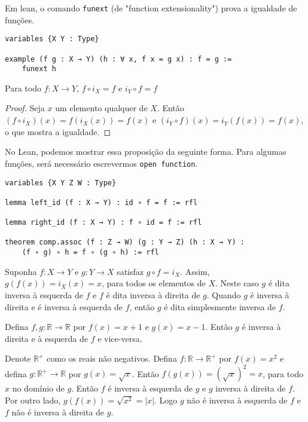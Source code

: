 Em lean, o comando \lstinline{funext} (de "function extensionality") prova a
igualdade de funções.

\begin{lstlisting}
variables {X Y : Type}

example (f g : X → Y) (h : ∀ x, f x = g x) : f = g :=
    funext h
\end{lstlisting}

\begin{theorem}
    \label{prop1}
    Para todo $f: X \to Y$, $f \circ i_X = f$ e $i_Y \circ f = f$
\end{theorem}
\begin{proof}
    Seja $x$ um elemento qualquer de $X$. Então $(f \circ i_X)(x) = f(i_X(x))
     = f(x)$ e $(i_Y \circ f)(x) = i_Y(f(x)) = f(x)$, o que mostra a
     igualdade.
\end{proof}

No Lean, podemos mostrar essa proposição da seguinte forma. Para algumas
funções, será necessário escrevermos \lstinline{open function}.

\begin{lstlisting}
variables {X Y Z W : Type}

lemma left_id (f : X → Y) : id ∘ f = f := rfl

lemma right_id (f : X → Y) : f ∘ id = f := rfl

theorem comp.assoc (f : Z → W) (g : Y → Z) (h : X → Y) :
    (f ∘ g) ∘ h = f ∘ (g ∘ h) := rfl

\end{lstlisting}

\begin{definition}
    \label{def4}
    Suponha $f:X \to Y$ e $g : Y \to X$ satisfaz $g \circ f = i_X$. Assim,
    $g(f(x)) = i_X(x) = x$, para todos os elementos de $X$. Neste caso $g$ é
    dita inversa à esquerda de $f$ e $f$ é dita inversa à direita de $g$.
    Quando $g$ é inversa à direita e é inversa à esquerda de $f$, então $g$ é
    dita simplesmente inversa de $f$.
\end{definition}

\begin{example}
    \label{ex1}
    Defina $f,g : \mathbb{R} \to \mathbb{R}$ por $f(x) = x + 1$ e $g(x) = x -
    1$. Então $g$ é inversa à direita e à esquerda de $f$ e vice-versa.
\end{example}
\begin{example}
    \label{ex2}
    Denote $\mathbb{R}^{+}$ como os reais não negativos. Defina $f :
    \mathbb{R} \to \mathbb{R}^{+}$ por $f(x) = x^2$ e defina $g : \mathbb{R}^+
    \to \mathbb{R}$ por $g(x) = \sqrt{x}$. Então $f(g(x)) = (\sqrt{x})^2 = x$,
    para todo $x$ no domínio de $g$. Então $f$ é inversa à esquerda de $g$ e
    $g$ inversa à direita de $f$. Por outro lado, $g(f(x)) = \sqrt{x^2} =
    |x|$. Logo $g$ não é inversa à esquerda de $f$ e $f$ não é inversa à
    direita de $g$.
\end{example}

